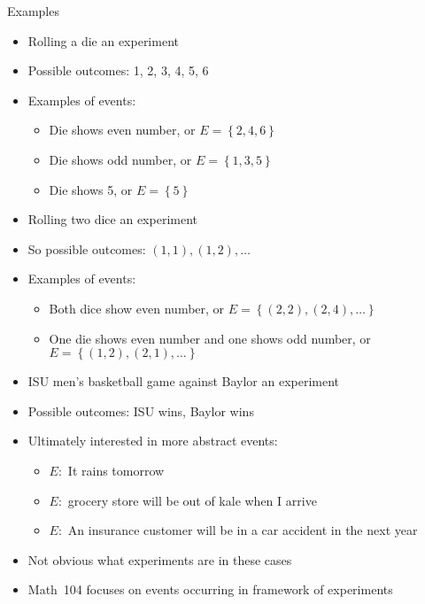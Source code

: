 \documentclass[handout]{beamer}
\theoremstyle{definition}
\begin{document}
\begin{frame}{Examples}
\begin{example}
\begin{itemize}
\item Rolling a die an experiment
\item Possible outcomes: 1, 2, 3, 4, 5, 6
\item Examples of events:
\begin{itemize}
\item Die shows even number, or $E=\left\{2,4,6\right\}$
\item Die shows odd number, or $E=\left\{1,3,5\right\}$
\item Die shows 5, or $E=\left\{5\right\}$
\end{itemize}
\end{itemize}
\end{example}
\begin{example}
\begin{itemize}
\item Rolling \alert{two} dice an experiment
\item So possible outcomes: $\left(1,1\right),\left(1,2\right),\ldots$
\item Examples of events:
\begin{itemize}
\item Both dice show even number, or $E=\left\{\left(2,2\right),
\left(2,4\right),\ldots\right\}$
\item One die shows even number and one shows odd number,
or $E=\left\{\left(1,2\right),\left(2,1\right),\ldots\right\}$
\end{itemize}
\end{itemize}
\end{example}
\end{frame}

\begin{frame}
\begin{example}
\begin{itemize}
\item ISU men's basketball game against Baylor an experiment
\item Possible outcomes: ISU wins, Baylor wins
\end{itemize}
\end{example}
\begin{itemize}
\item Ultimately interested in more abstract events:
\begin{itemize}
\item $E:$ It rains tomorrow
\item $E:$ grocery store will be out of kale when I arrive
\item $E:$ An insurance customer will be in a car accident in the next year
\end{itemize}
\item Not obvious what experiments are in these cases
\item Math~104 focuses on events occurring in framework of experiments
\end{itemize}
\end{frame}
\end{document}
